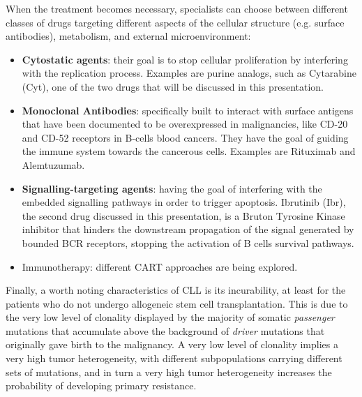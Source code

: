 When the treatment becomes necessary, specialists can choose between different classes of drugs targeting different aspects of the cellular structure (e.g. surface antibodies), metabolism, and external microenvironment:
\begin{itemize}
	\item \textbf{Cytostatic agents}: their goal is to stop cellular proliferation by interfering with the replication process. Examples are purine analogs, such as Cytarabine (Cyt), one of the two drugs that will be discussed in this presentation.
	\item \textbf{Monoclonal Antibodies}: specifically built to interact with surface antigens that have been documented to be overexpressed in malignancies, like CD-20 and CD-52 receptors in B-cells blood cancers. They have the goal of guiding the immune system towards the cancerous cells. Examples are Rituximab and Alemtuzumab.
	\item \textbf{Signalling-targeting agents}: having the goal of interfering with the embedded signalling pathways in order to trigger apoptosis. Ibrutinib (Ibr), the second drug discussed in this presentation, is a Bruton Tyrosine Kinase inhibitor that hinders the downstream propagation of the signal generated by bounded BCR receptors, stopping the activation of B cells survival pathways. 
\item Immunotherapy: different CART approaches are being explored.
\end{itemize} \par
\vspace{0.4cm}
Finally, a worth noting characteristics of CLL is its incurability, at least for the patients who do not undergo allogeneic stem cell transplantation. This is due to the very low level of clonality displayed by the majority of somatic \textit{passenger} mutations that accumulate above the background of \textit{driver} mutations that originally gave birth to the malignancy. A very low level of clonality implies a very high tumor heterogeneity, with different subpopulations carrying different sets of mutations, and in turn a very high tumor heterogeneity increases the probability of developing primary resistance. \par


